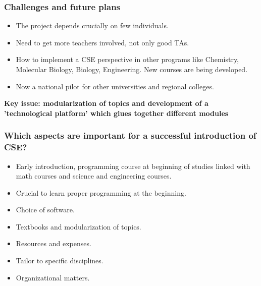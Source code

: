 \documentclass{beamer}
\begin{document}
\begin{frame}
\frametitle{Challenges and future plans}

\begin{block}{}

\begin{itemize}
\item The project depends crucially on few individuals. 

\item Need to get more teachers involved, not only good TAs.

\item How  to implement a CSE perspective in other programs like Chemistry, Molecular Biology,  Biology, Engineering. New courses are being developed.

\item Now a national pilot for other universities and regional colleges.
\end{itemize}

\noindent
\textbf{Key issue: modularization of topics and development of a 'technological platform' which glues together different modules}

\end{block}
\end{frame}

\begin{frame}
\frametitle{Which aspects are important for a successful introduction of CSE?}

\begin{block}{}

\begin{itemize}
\item Early introduction, programming course at beginning of studies linked with math courses and science and engineering courses.

\item Crucial to learn proper programming at the beginning.

\item Choice of software.

\item Textbooks and modularization of topics.

\item Resources and expenses.

\item Tailor to specific disciplines.

\item Organizational matters.
\end{itemize}

\noindent
\end{block}
\end{frame}
\end{document}
